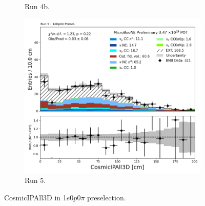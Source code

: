 \begin{figure}[H]
\begin{subfigure}[t]{0.32\linewidth}
        \caption{Run 4b.}
    \end{subfigure}%
    \hspace{0.2cm}%
    \begin{subfigure}[t]{0.32\linewidth}
        \includegraphics[width=\linewidth]{technote/Appendix_Preselection/Figures/1e0p0pi/Run5/CosmicIPAll3D_Run5_1e0p0pi_Presel.png}
        \caption{Run 5.}
    \end{subfigure}
    \caption{CosmicIPAll3D in 1$e$0$p$0$\pi$ preselection.}
\end{figure}

